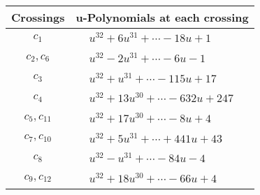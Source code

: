 \documentclass[1p]{elsarticle_modified}
\theoremstyle{definition}
\begin{document}
\begin{tabular}{m{50pt}|m{274pt}}
Crossings & \hspace{64pt}u-Polynomials at each crossing \\
\hline $$\begin{aligned}c_{1}\end{aligned}$$&$\begin{aligned}
&u^{32}+6 u^{31}+\cdots-18 u+1
\end{aligned}$\\
\hline $$\begin{aligned}c_{2},c_{6}\end{aligned}$$&$\begin{aligned}
&u^{32}-2 u^{31}+\cdots-6 u-1
\end{aligned}$\\
\hline $$\begin{aligned}c_{3}\end{aligned}$$&$\begin{aligned}
&u^{32}+u^{31}+\cdots-115 u+17
\end{aligned}$\\
\hline $$\begin{aligned}c_{4}\end{aligned}$$&$\begin{aligned}
&u^{32}+13 u^{30}+\cdots-632 u+247
\end{aligned}$\\
\hline $$\begin{aligned}c_{5},c_{11}\end{aligned}$$&$\begin{aligned}
&u^{32}+17 u^{30}+\cdots-8 u+4
\end{aligned}$\\
\hline $$\begin{aligned}c_{7},c_{10}\end{aligned}$$&$\begin{aligned}
&u^{32}+5 u^{31}+\cdots+441 u+43
\end{aligned}$\\
\hline $$\begin{aligned}c_{8}\end{aligned}$$&$\begin{aligned}
&u^{32}- u^{31}+\cdots-84 u-4
\end{aligned}$\\
\hline $$\begin{aligned}c_{9},c_{12}\end{aligned}$$&$\begin{aligned}
&u^{32}+18 u^{30}+\cdots-66 u+4
\end{aligned}$\\
\hline
\end{tabular}\\~\\
\end{document}
